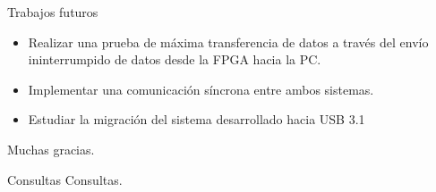 \begin{frame}{Trabajos futuros}
	\begin{itemize}
		\item Realizar una prueba de máxima transferencia de datos a través del envío ininterrumpido de datos desde la FPGA hacia la PC.
		\item Implementar una comunicación síncrona entre ambos sistemas.
		\item Estudiar la migración del sistema desarrollado hacia USB 3.1
	\end{itemize}
\end{frame}

\begin{frame}{}
	\centering
	\alert {Muchas gracias.}
\end{frame}

\begin{frame}{Consultas}
	\centering
	Consultas.
\end{frame}
